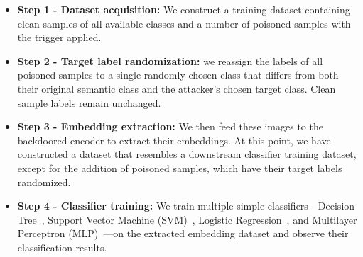 \documentclass[letterpaper,twocolumn,10pt]{article}
\begin{document}
\begin{itemize}[leftmargin=0pt]
    \item \textbf{Step 1 - Dataset acquisition:} We construct a training dataset containing clean samples of all available classes and a number of poisoned samples with the trigger applied.
    \item \textbf{Step 2 - Target label randomization:} we reassign the labels of all poisoned samples to a single randomly chosen class that differs from both their original semantic class and the attacker's chosen target class. Clean sample labels remain unchanged.
    \item \textbf{Step 3 - Embedding extraction:} We then feed these images to the backdoored encoder to extract their embeddings. At this point, we have constructed a dataset that resembles a downstream classifier training dataset, except for the addition of poisoned samples, which have their target labels randomized.
    \item \textbf{Step 4 - Classifier training:} We train multiple simple classifiers---Decision Tree~\cite{breiman2017classification}, Support Vector Machine (SVM)~\cite{cortes1995support}, Logistic Regression~\cite{montgomery2021introduction}, and Multilayer Perceptron (MLP)~\cite{rumelhart1986learning}---on the extracted embedding dataset and observe their classification results.
\end{itemize}
\begin{table}[h]
\centering
\caption{Performance of simple downstream models with target labels randomized for poisoned samples.}
\label{tab:finding_experiment}
\end{table}
\end{document}
